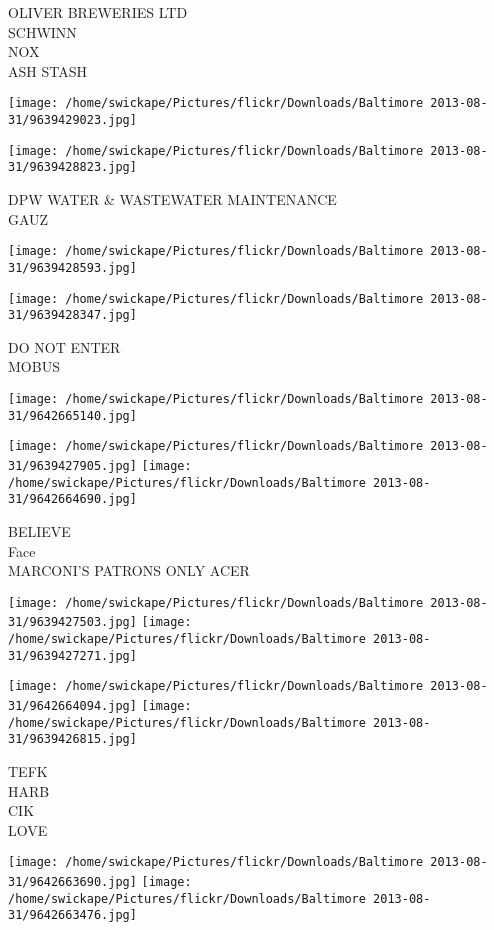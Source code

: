 \documentclass[10pt,letterpaper]{article}
\begin{document}
OLIVER BREWERIES LTD\\
SCHWINN\\
NOX\\
ASH STASH
\pagebreak

\texttt{[image: /home/swickape/Pictures/flickr/Downloads/Baltimore 2013-08-31/9639429023.jpg]}

\vspace{0.25in}
\texttt{[image: /home/swickape/Pictures/flickr/Downloads/Baltimore 2013-08-31/9639428823.jpg]}

DPW WATER \& WASTEWATER MAINTENANCE\\
GAUZ
\pagebreak

\texttt{[image: /home/swickape/Pictures/flickr/Downloads/Baltimore 2013-08-31/9639428593.jpg]}

\vspace{0.25in}
\texttt{[image: /home/swickape/Pictures/flickr/Downloads/Baltimore 2013-08-31/9639428347.jpg]}

DO NOT ENTER\\
MOBUS
\pagebreak

\texttt{[image: /home/swickape/Pictures/flickr/Downloads/Baltimore 2013-08-31/9642665140.jpg]}

\vspace{0.25in}
\texttt{[image: /home/swickape/Pictures/flickr/Downloads/Baltimore 2013-08-31/9639427905.jpg]}
\texttt{[image: /home/swickape/Pictures/flickr/Downloads/Baltimore 2013-08-31/9642664690.jpg]}

BELIEVE\\
Face\\
MARCONI'S PATRONS ONLY ACER
\pagebreak

\texttt{[image: /home/swickape/Pictures/flickr/Downloads/Baltimore 2013-08-31/9639427503.jpg]}
\texttt{[image: /home/swickape/Pictures/flickr/Downloads/Baltimore 2013-08-31/9639427271.jpg]}

\texttt{[image: /home/swickape/Pictures/flickr/Downloads/Baltimore 2013-08-31/9642664094.jpg]}
\texttt{[image: /home/swickape/Pictures/flickr/Downloads/Baltimore 2013-08-31/9639426815.jpg]}

TEFK\\
HARB\\
CIK\\
LOVE
\pagebreak

\texttt{[image: /home/swickape/Pictures/flickr/Downloads/Baltimore 2013-08-31/9642663690.jpg]}
\texttt{[image: /home/swickape/Pictures/flickr/Downloads/Baltimore 2013-08-31/9642663476.jpg]}
\end{document}
